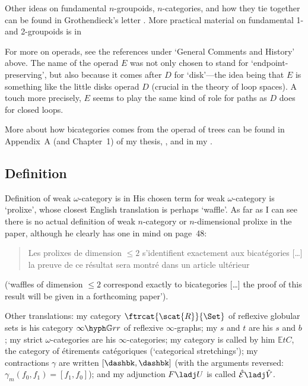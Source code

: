 Other ideas on fundamental $n$-groupoids, $n$-categories, and how they tie
together can be found in Grothendieck's letter .  More practical
material on fundamental 1- and 2-groupoids is in
% 
%
% 

For more on operads, see the references under `General Comments and History'
above.  The name of the operad $E$ was not only chosen to stand for
`endpoint-preserving', but also because it comes after $D$ for `disk'---the
idea being that $E$ is something like the little disks operad $D$ (crucial
in the theory of loop spaces).  A touch more precisely, $E$ seems to play the
same kind of role for paths as $D$ does for closed loops.

More about how bicategories comes from the operad of trees can be found in
Appendix~A (and Chapter~1) of my thesis, , and in my .  




\subsection*{Definition }

Definition  of weak $\omega$-category is in
% 
%
% 
His chosen term for weak $\omega$-category is `prolixe', whose closest
English translation is perhaps `waffle'.  As far as I can see there is no 
actual definition of weak $n$-category or $n$-dimensional prolixe in the
paper, although he clearly has one in mind on page~48:
%
\begin{quote}
Les prolixes de dimension $\leq 2$ s'identifient exactement aux
bicat\'egories [\ldots] la preuve de ce r\'esultat sera montr\'e dans un
article ult\'erieur
\end{quote}
%
(`waffles of dimension $\leq 2$ correspond exactly to bicategories [\ldots]
the proof of this result will be given in a forthcoming paper').

Other translations: my category $\ftrcat{\scat{R}}{\Set}$ of reflexive
globular sets is his category $\infty\hyph\mathbb{G}rr$ of reflexive
$\infty$-graphs; my $s$ and $t$ are his $s$ and $b$; my strict
$\omega$-categories are his $\infty$-categories; my category  is
called by him $\mathbb{E}tC$, the category of \'etirements cat\'egoriques
(`categorical stretchings'); my contractions $\gamma$ are written
$[\dashbk,\dashbk]$ (with the arguments reversed: $\gamma_m(f_0,f_1) =
[f_1,f_0]$); and my adjunction $F\ladj U$ is called $\hat{\mathcal{E}} \ladj
\hat{V}$.

